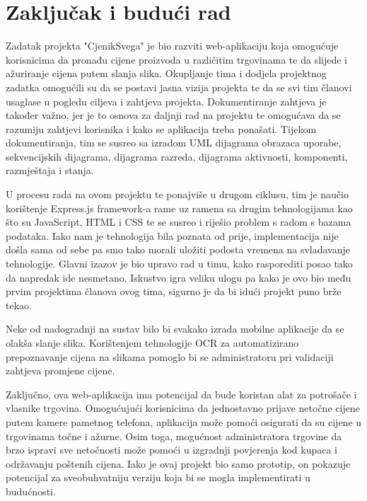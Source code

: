 \chapter{Zaključak i budući rad}
		
		
		
		
		
		Zadatak projekta "CjenikSvega" je bio razviti web-aplikaciju koja omogućuje korisnicima da pronađu cijene proizvoda u različitim trgovinama te da slijede i ažuriranje cijena putem slanja slika. 
		Okupljanje tima i dodjela projektnog zadatka omogućili su da se postavi jasna vizija projekta te da se svi tim članovi usaglase u pogledu ciljeva i zahtjeva projekta. Dokumentiranje zahtjeva je također važno, jer je to osnova za daljnji rad na projektu te omogućava da se razumiju zahtjevi korisnika i kako se aplikacija treba ponašati. Tijekom dokumentiranja, tim se susreo sa izradom UML dijagrama obrazaca uporabe, sekvencijskih dijagrama, dijagrama razreda, dijagrama aktivnosti, komponenti, razmještaja i stanja.
		
		U procesu rada na ovom projektu te ponajviše u drugom ciklusu, tim je naučio korištenje Express.js framework-a rame uz ramena sa drugim tehnologijama kao što su JavaScript, HTML i CSS te se susreo i riješio problem s radom s bazama podataka. Iako nam je tehnologija bila poznata od prije, implementacija nije došla sama od sebe pa smo tako morali uložiti podosta vremena na svladavanje tehnologije. Glavni izazov je bio upravo rad u timu, kako rasporediti posao tako da napredak ide nesmetano. Iskustvo igra veliku ulogu pa kako je ovo bio među prvim projektima članova ovog tima, sigurno je da bi idući projekt puno brže tekao.

Neke od nadogradnji na sustav bilo bi svakako izrada mobilne aplikacije da se olakša slanje slika. Korištenjem tehnologije OCR za automatizirano prepoznavanje cijena na slikama pomoglo bi se administratoru pri validaciji zahtjeva promjene cijene.

Zaključno, ova web-aplikacija ima potencijal da bude koristan alat za potrošače i vlasnike trgovina. Omogućujući korisnicima da jednostavno prijave netočne cijene putem kamere pametnog telefona, aplikacija može pomoći osigurati da su cijene u trgovinama točne i ažurne. Osim toga, mogućnost administratora trgovine da brzo ispravi sve netočnosti može pomoći u izgradnji povjerenja kod kupaca i održavanju poštenih cijena. Iako je ovaj projekt bio samo prototip, on pokazuje potencijal za sveobuhvatniju verziju koja bi se mogla implementirati u budućnosti.
		\eject 